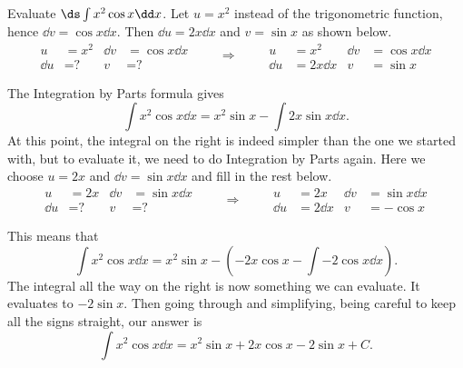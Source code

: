 \begin{example}\label{ex_ibp3}
Evaluate $\ds\int x^2\cos x\dd x$.
\solution
Let $u=x^2$ instead of the trigonometric function, hence $\dd v=\cos x\dd x$.  Then $\dd u=2x\dd x$ and $v=\sin x$ as shown below.
\[
\begin{aligned}
u&= x^2 & \dd v&=\cos x\dd x\\
\dd u&= \text{?} & v&=\text{?}
\end{aligned}
\qquad\Rightarrow\qquad
\begin{aligned}
u&= x^2 & \dd v&=\cos x\dd x\\
\dd u&= 2x\dd x & v&=\sin x
\end{aligned}
\]

The Integration by Parts formula gives
\[\int x^2\cos x\dd x = x^2\sin x - \int 2x\sin x\dd x.\]
At this point, the integral on the right is indeed simpler than the one we started with, but to evaluate it, we need to do Integration by Parts again. Here we choose $u=2x$ and $\dd v=\sin x\dd x$ and fill in the rest below.
\[
\begin{aligned}
u&= 2x & \dd v&=\sin x\dd x\\
\dd u&= \text{?} & v&=\text{?}
\end{aligned}
\qquad\Rightarrow\qquad
\begin{aligned}
u&= 2x & \dd v&=\sin x\dd x\\
\dd u&= 2\dd x & v&=-\cos x
\end{aligned}
\]

This means that
\[\int x^2\cos x\dd x = x^2\sin x - \left(-2x\cos x - \int -2\cos x\dd x\right).\]
The integral all the way on the right is now something we can evaluate.  It evaluates to $-2\sin x$.  Then going through and simplifying, being careful to keep all the signs straight, our answer is
\[\int x^2\cos x\dd x = x^2\sin x  + 2x\cos x - 2\sin x + C.\]
\end{example}

